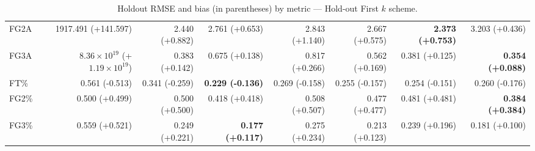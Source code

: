 \begin{table}[H]
{\begin{tabular}{lrrrrrrr}
FG2A & 1917.491 (+141.597) & 2.440 (+0.882) & 2.761 (+0.653) & 2.843 (+1.140) & 2.667 (+0.575) & \textbf{2.373 (+0.753)} & 3.203 (+0.436) \\
FG3A & $8.36\times10^{19}$ (+$1.19\times10^{19}$) & 0.383 (+0.142) & 0.675 (+0.138) & 0.817 (+0.266) & 0.562 (+0.169) & 0.381 (+0.125) & \textbf{0.354 (+0.088)} \\
FT\% & 0.561 (-0.513) & 0.341 (-0.259) & \textbf{0.229 (-0.136)} & 0.269 (-0.158) & 0.255 (-0.157) & 0.254 (-0.151) & 0.260 (-0.176) \\
FG2\% & 0.500 (+0.499) & 0.500 (+0.500) & 0.418 (+0.418) & 0.508 (+0.507) & 0.477 (+0.477) & 0.481 (+0.481) & \textbf{0.384 (+0.384)} \\
FG3\% & 0.559 (+0.521) & 0.249 (+0.221) & \textbf{0.177 (+0.117)} & 0.275 (+0.234) & 0.213 (+0.123) & 0.239 (+0.196) & 0.181 (+0.100) \\
\bottomrule
\end{tabular}
}
\caption{Holdout RMSE and bias (in parentheses) by metric — Hold-out First $k$ scheme.}
\label{tab:coverage_holdout_first_k}
\end{table}

